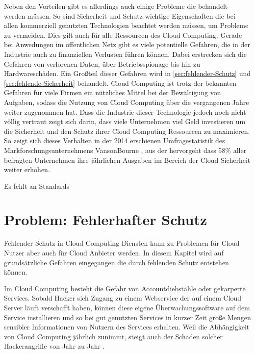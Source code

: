 Neben den Vorteilen gibt es allerdings auch einige Probleme die behandelt werden müssen. So sind Sicherheit und Schutz wichtige Eigenschaften die bei allen kommerziell genutzten Technologien beachtet werden müssen, um Probleme zu vermeiden. Dies gilt auch für alle Ressourcen des Cloud Computing. Gerade bei Anwedungen im öffentlichen Netz gibt es viele potentielle Gefahren, die in der Industrie auch zu finanziellen Verlusten führen können. 
Dabei erstrecken sich die Gefahren von verlorenen Daten, über Betriebsspionage bis hin zu Hardwareschäden. Ein Großteil dieser Gefahren wird in \autoref{sec:fehlender-Schutz} und \autoref{sec:fehlende-Sicherheit} behandelt.
Cloud Computing ist trotz der bekannten Gefahren für viele Firmen ein nützliches Mittel bei der Bewältigung von Aufgaben, sodass die Nutzung von Cloud Computing über die vergangenen Jahre weiter zugenommen hat.
Dass die Industrie dieser Technologie jedoch noch nicht völlig vertraut zeigt sich darin, dass viele Unternehmen viel Geld investieren um die Sicherheit und den Schutz ihrer Cloud Computing Ressourcen zu maximieren. So zeigt sich dieses Verhalten in der 2014 erschienen Umfragestatistik des Markforschungsunternehmens VansonBourne \cite{vansonbourne2014}, aus der hervorgeht dass 58\% aller befragten Unternehmen ihre jährlichen Ausgaben im Bereich der Cloud Sicherheit weiter erhöhen.

Es fehlt an Standards \cite{puthal2015}

\section{Problem: Fehlerhafter Schutz}
\label{sec:fehlender-Schutz}
Fehlender Schutz in Cloud Computing Diensten kann zu Problemen für Cloud Nutzer aber auch für Cloud Anbieter werden. In diesem Kapitel wird auf grundsätzliche Gefahren eingegangen die durch fehlenden Schutz entstehen können.

Im Cloud Computing besteht die Gefahr von Accountdiebstähle oder gekarperte Services. 
Sobald Hacker sich Zugang zu einem Webservice der auf einem Cloud Server läuft verschafft haben, 
können diese eigene Überwachungssoftware auf dem Service installieren 
und so bei gut genutzten Services in kurzer Zeit große Mengen sensibler Informationen von Nutzern des Services erhalten.
Weil die Abhängigkeit von Cloud Computing jährlich zunimmt, 
steigt auch der Schaden solcher Hackerangriffe von Jahr zu Jahr \cite{jabbar2020}. 
 
